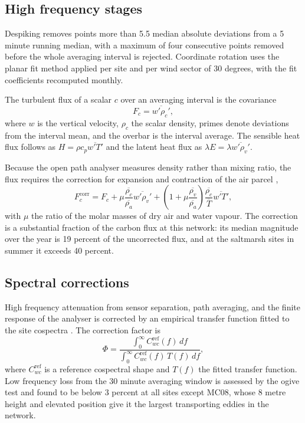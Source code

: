 \subsection{High frequency stages}
\label{sec:proc-highfreq}

Despiking removes points more than 5.5 median absolute deviations from a 5
minute running median, with a maximum of four consecutive points removed before
the whole averaging interval is rejected. Coordinate rotation uses the planar
fit method applied per site and per wind sector of 30 degrees, with the fit
coefficients recomputed monthly.

The turbulent flux of a scalar $c$ over an averaging interval is the covariance
\begin{equation}
  F_c = \overline{w' \rho_c'},
  \label{eq:covariance}
\end{equation}
where $w$ is the vertical velocity, $\rho_c$ the scalar density, primes denote
deviations from the interval mean, and the overbar is the interval average. The
sensible heat flux follows as $H = \rho c_p \overline{w'T'}$ and the latent heat
flux as $\lambda E = \lambda \overline{w' \rho_v'}$.

Because the open path analyser measures density rather than mixing ratio, the
flux requires the correction for expansion and contraction of the air parcel
\citep{duvall2015density},
\begin{equation}
  F_c^{\mathrm{corr}} = F_c
    + \mu \frac{\overline{\rho_c}}{\overline{\rho_a}} \overline{w'\rho_v'}
    + \left( 1 + \mu \frac{\overline{\rho_v}}{\overline{\rho_a}} \right)
      \frac{\overline{\rho_c}}{\overline{T}} \overline{w'T'},
  \label{eq:wpl}
\end{equation}
with $\mu$ the ratio of the molar masses of dry air and water vapour. The
correction is a substantial fraction of the carbon flux at this network: its
median magnitude over the year is 19 percent of the uncorrected flux, and at the
saltmarsh sites in summer it exceeds 40 percent.

\subsection{Spectral corrections}
\label{sec:proc-spectral}

High frequency attenuation from sensor separation, path averaging, and the
finite response of the analyser is corrected by an empirical transfer function
fitted to the site cospectra \citep{grothe2018spectral}. The correction factor is
\begin{equation}
  \Phi = \frac{\int_0^{\infty} C_{wc}^{\mathrm{ref}}(f) \, df}
              {\int_0^{\infty} C_{wc}^{\mathrm{ref}}(f) \, T(f) \, df},
  \label{eq:spectral-correction}
\end{equation}
where $C_{wc}^{\mathrm{ref}}$ is a reference cospectral shape and $T(f)$ the
fitted transfer function. Low frequency loss from the 30 minute averaging window
is assessed by the ogive test and found to be below 3 percent at all sites
except MC08, whose 8 metre height and elevated position give it the largest
transporting eddies in the network.

